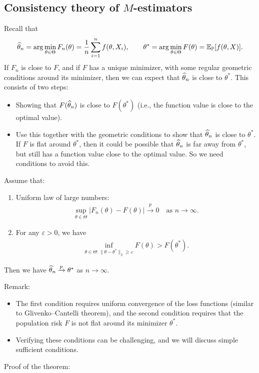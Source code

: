 \documentclass[11pt,letterpaper]{article}
\numberwithin{assumption}{lecture}
\numberwithin{theorem}{lecture}
\numberwithin{proposition}{lecture}
\numberwithin{lemma}{lecture}
\numberwithin{claim}{lecture}
\numberwithin{corollary}{lecture}
\numberwithin{definition}{lecture}
\numberwithin{conjecture}{lecture}
\numberwithin{remark}{lecture}
\numberwithin{example}{lecture}
\numberwithin{equation}{lecture}
\begin{document}
\subsection{Consistency theory of $M$-estimators}
Recall that
\begin{align*}
  \widehat{\theta}_n = \arg\min_{\theta \in \Theta} F_n (\theta) = \frac{1}{n} \sum_{i=1}^n f(\theta, X_i), \qquad \theta^* = \arg\min_{\theta \in \Theta} F(\theta) = {\mathbb{E}}_{{\mathbb{P}}} [f(\theta, X)].
\end{align*}
If $F_n$ is close to $F$, and if $F$ has a unique minimizer, with some regular geometric conditions around its minimizer, then we can expect that $\widehat{\theta}_n$ is close to $\theta^*$. This consists of two steps:
\begin{itemize}
  \item Showing that $F (\widehat{\theta}_n)$ is close to $F (\theta^*)$ (i.e., the function value is close to the optimal value).
  \item Use this together with the geometric conditions to show that $\widehat{\theta}_n$ is close to $\theta^*$. If $F$ is flat around $\theta^*$, then it could be possible that $\widehat{\theta}_n$ is far away from $\theta^*$, but still has a function value close to the optimal value. So we need conditions to avoid this.
\end{itemize}
\begin{theorem}
  Assume that:
  \begin{enumerate}
  \item Uniform law of large numbers:
  \begin{align*}
    \sup_{\theta \in \Theta} |F_n (\theta) - F(\theta)| \xrightarrow{p} 0 \quad \text{as } n \to \infty.
  \end{align*}
  \item For any $\varepsilon > 0$, we have
  \begin{align*}
    \inf_{\theta \in \Theta: \|\theta - \theta^*\|_2 \geq \varepsilon} F(\theta) > F(\theta^*).
  \end{align*}
  \end{enumerate}
  Then we have $\widehat{\theta}_n \xrightarrow{p} \theta^*$ as $n \to \infty$.
\end{theorem}
Remark:
\begin{itemize}
  \item The first condition requires uniform convergence of the loss functions (similar to Glivenko--Cantelli theorem), and the second condition requires that the population risk $F$ is not flat around its minimizer $\theta^*$.
  \item Verifying these conditions can be challenging, and we will discuss simple sufficient conditions.
\end{itemize}
Proof of the theorem:
\end{document}
